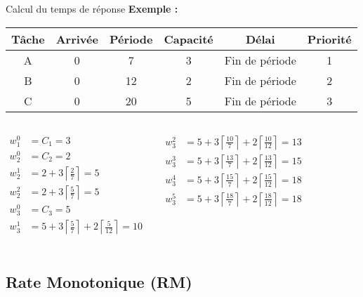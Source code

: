 \begin{frame}{Calcul du temps de réponse}
  \textbf{Exemple :}
  \begin{center}
    \begin{tabular}{cccccc}
      \hline
      Tâche & Arrivée & Période & Capacité & Délai & Priorité \\
      \hline
      A & 0 &  7 & 3 & Fin de période & 1\\
      B & 0 & 12 & 2 & Fin de période & 2\\
      C & 0 & 20 & 5 & Fin de période & 3\\
      \hline
    \end{tabular}
  \end{center}
  \pause
  \begin{columns}
    \begin{align*}
      w_1^0 &= C_1 = 3\\
      w_2^0 &= C_2 = 2\\
      w_2^1 &= 2 + 3 \left\lceil\frac{2}{7}\right\rceil = 5\\
      w_2^2 &= 2 + 3 \left\lceil\frac{5}{7}\right\rceil = 5\\
      w_3^0 &= C_3 = 5\\
      w_3^1 &= 5 + 3 \left\lceil\frac{5}{7}\right\rceil + 2 \left\lceil\frac{5}{12}\right\rceil = 10\\
    \end{align*}

    \begin{align*}
      w_3^2 &= 5 + 3 \left\lceil\frac{10}{7}\right\rceil + 2 \left\lceil\frac{10}{12}\right\rceil = 13\\
      w_3^3 &= 5 + 3 \left\lceil\frac{13}{7}\right\rceil + 2 \left\lceil\frac{13}{12}\right\rceil = 15\\
      w_3^4 &= 5 + 3 \left\lceil\frac{15}{7}\right\rceil + 2 \left\lceil\frac{15}{12}\right\rceil = 18\\
      w_3^5 &= 5 + 3 \left\lceil\frac{18}{7}\right\rceil + 2 \left\lceil\frac{18}{12}\right\rceil = 18\\
    \end{align*}
  \end{columns}
\end{frame}

\subsection{Rate Monotonique (RM)}

